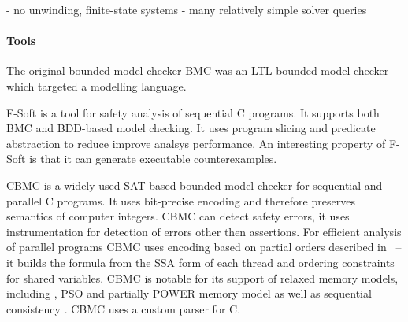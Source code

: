 - no unwinding, finite-state systems
- many relatively simple solver queries

\paragraph{Tools}

The original bounded model checker BMC  was an LTL bounded
model checker which targeted a modelling language.

F-Soft  is a tool for safety analysis of sequential C programs.
It supports both BMC and BDD-based model checking.
It uses program slicing and predicate abstraction to reduce improve analsys performance.
An interesting property of F-Soft is that it can generate executable counterexamples.

CBMC  is a widely used SAT-based bounded
model checker for sequential and parallel C programs.
It uses bit-precise encoding and therefore preserves semantics of computer
integers.
CBMC can detect safety errors, it uses instrumentation for detection of errors
other then assertions.
For efficient analysis of parallel programs CBMC uses encoding based on partial
orders described in~ -- it builds the formula from the SSA
form of each thread and ordering constraints for shared variables.
CBMC is notable for its support of relaxed memory models, including \xtso,
PSO and partially POWER memory model as well as sequential consistency .
CBMC uses a custom parser for C.

